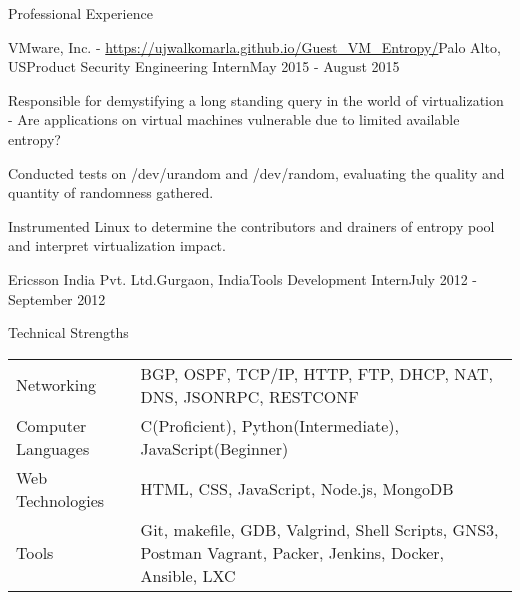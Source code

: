 \documentclass{resume} %
\begin{document}
\begin{rSection}{Professional Experience}
	\begin{rSubsectionEmployment}{VMware, Inc. - \url{https://ujwalkomarla.github.io/Guest_VM_Entropy/}}{Palo Alto, US}{Product Security Engineering Intern}{May 2015 - August 2015}
    	\item Responsible for demystifying a long standing query in the world of
    virtualization - Are applications on virtual machines vulnerable due to limited available entropy?
      	\item Conducted tests on /dev/urandom and /dev/random, evaluating the quality and quantity of randomness gathered.
        \item Instrumented Linux to determine the contributors and drainers of entropy pool and interpret virtualization impact.
	\end{rSubsectionEmployment}
	
    \begin{rSubsectionEmploymentSimple}{Ericsson India Pvt. Ltd.}{Gurgaon, India}{Tools Development Intern}{July 2012 - September 2012}
        \begin{comment}
        	\item Programmed tools for Excel, that compressed network statistics to a dashboard representation.
          	\item The automation saved the team from manual work and provided opportunity to improve and find new sales.   
        \end{comment}
   	\end{rSubsectionEmploymentSimple}
    
\end{rSection}


\begin{rSection}{Technical Strengths}
    \begin{tabularx}{\textwidth}{lX}%
        Networking & BGP, OSPF, TCP/IP, HTTP, FTP, DHCP, NAT, DNS, JSONRPC, RESTCONF\\ 
        Computer Languages & C(Proficient), Python(Intermediate), JavaScript(Beginner)\\
        Web Technologies & HTML, CSS, JavaScript, Node.js, MongoDB\\
        Tools & Git, makefile, GDB, Valgrind, Shell Scripts, GNS3, Postman \newline Vagrant, Packer, Jenkins, Docker, Ansible, LXC
    \end{tabularx}
\end{rSection}
\end{document}
